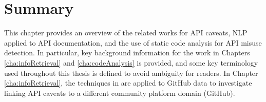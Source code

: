 \section{Summary}
This chapter provides an overview of the related works for API caveats, NLP applied to API documentation, and the use of static code analysis for API misuse detection. In particular, key background information for the work in Chapters \ref{cha:infoRetrieval} and \ref{cha:codeAnalysis} is provided, and some key terminology used throughout this thesis is defined to avoid ambiguity for readers. In Chapter \ref{cha:infoRetrieval}, the techniques in \cite{jiamou} are applied to GitHub data to investigate linking API caveats to a different community platform domain (GitHub).


